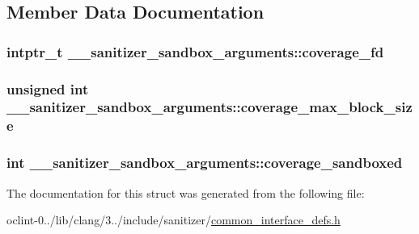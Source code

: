 \subsection{Member Data Documentation}
\hypertarget{struct____sanitizer__sandbox__arguments_ac8fc828482e930fa5e629eef7690081c}{
\subsubsection[{coverage\-\_\-fd}]{\setlength{\rightskip}{0pt plus 5cm}intptr\-\_\-t \-\_\-\-\_\-sanitizer\-\_\-sandbox\-\_\-arguments\-::coverage\-\_\-fd}}\label{struct____sanitizer__sandbox__arguments_ac8fc828482e930fa5e629eef7690081c}
\hypertarget{struct____sanitizer__sandbox__arguments_aa21dbbb141699e131a0eca74a4a9f199}{
\subsubsection[{coverage\-\_\-max\-\_\-block\-\_\-size}]{\setlength{\rightskip}{0pt plus 5cm}unsigned int \-\_\-\-\_\-sanitizer\-\_\-sandbox\-\_\-arguments\-::coverage\-\_\-max\-\_\-block\-\_\-size}}\label{struct____sanitizer__sandbox__arguments_aa21dbbb141699e131a0eca74a4a9f199}
\hypertarget{struct____sanitizer__sandbox__arguments_a4244658f10a2c2f8b6cb14d1cc6fd770}{
\subsubsection[{coverage\-\_\-sandboxed}]{\setlength{\rightskip}{0pt plus 5cm}int \-\_\-\-\_\-sanitizer\-\_\-sandbox\-\_\-arguments\-::coverage\-\_\-sandboxed}}\label{struct____sanitizer__sandbox__arguments_a4244658f10a2c2f8b6cb14d1cc6fd770}


The documentation for this struct was generated from the following file\-:\begin{DoxyCompactItemize}
\item 
oclint-\/0../lib/clang/3../include/sanitizer/\hyperlink{common__interface__defs_8h}{common\-\_\-interface\-\_\-defs.\-h}\end{DoxyCompactItemize}
